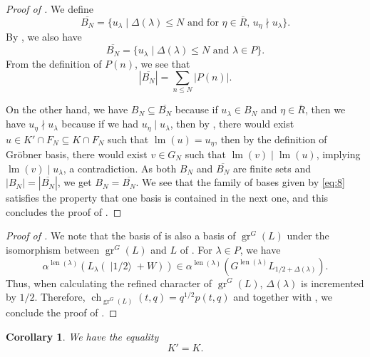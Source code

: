 \documentclass[a4paper, 12pt, reqno]{amsart}
\newtheorem{corollary}[theorem]{Corollary}
\theoremstyle{remark}
\DeclareMathOperator{\gr}{gr}
\DeclareMathOperator{\ch}{ch}
\DeclareMathOperator{\lm}{lm}
\DeclareMathOperator{\len}{len}
\DeclareMathOperator{\vachalf}{|1/2\rangle}
\begin{document}
\begin{proof}[Proof of ]
  We define
  \begin{equation*}
    \overline{B_N} = \{u_{\lambda} \mid \text{$\Delta(\lambda) \le N$ and for $\eta \in \overline{R}$, $u_{\eta} \nmid u_{\lambda}$}\}.
  \end{equation*}
  By , we also have
  \begin{equation*}
    \overline{B_N} = \{u_{\lambda} \mid \text{$\Delta(\lambda) \le N$ and $\lambda \in P$}\}.
  \end{equation*}
  From the definition of $P(n)$, we see that
  \begin{equation*}
    |\overline{B_N}| = \sum_{n \le N}|P(n)|.
  \end{equation*}

  On the other hand, we have $B_N \subseteq \overline{B_N}$ because if $u_{\lambda} \in B_N$ and $\eta \in \overline{R}$, then we have $u_{\eta} \nmid u_{\lambda}$ because if we had $u_{\eta} \mid u_{\lambda}$, then by , there would exist $u \in K' \cap F_N \subseteq K \cap F_N$ such that $\lm(u) = u_{\eta}$, then by the definition of Gröbner basis, there would exist $v \in G_N$ such that $\lm(v) \mid \lm(u)$, implying $\lm(v) \mid u_{\lambda}$, a contradiction.
  As both $B_N$ and $\overline{B_N}$ are finite sets and $|B_N| = |\overline{B_N}|$, we get $B_N = \overline{B_N}$.
  We see that the family of bases given by \eqref{eq:8} satisfies the property that one basis is contained in the next one, and this concludes the proof of .
\end{proof}

\begin{proof}[Proof of ]
  We note that the basis of  is also a basis of $\gr^G(L)$ under the isomorphism between $\gr^G(L)$ and $L$ of .
  For $\lambda \in P$, we have
  \begin{equation*}
    \alpha^{\len(\lambda)}(L_{\lambda}(\vachalf + W)) \in \alpha^{\len(\lambda)}(G^{\len(\lambda)}L_{1/2 + \Delta(\lambda)}).
  \end{equation*}
  Thus, when calculating the refined character of $\gr^G(L)$, $\Delta(\lambda)$ is incremented by $1/2$.
  Therefore, $\ch_{\gr^G(L)}(t, q) = q^{1/2}p(t, q)$ and together with , we conclude the proof of .
\end{proof}

\begin{corollary}
  \label{crl:1}
  We have the equality
  \begin{equation*}
    K' = K.
  \end{equation*}
\end{corollary}
\end{document}
